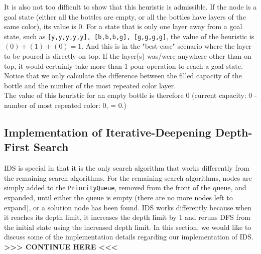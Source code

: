 \documentclass{article}
\begin{document}
It is also not too difficult to show that this heuristic is admissible. If the node is a goal state (either all the bottles are empty, or all the bottles have layers of the same color), its value is 0. For a state that is only one layer away from a goal state, such as \texttt{[y,y,y,y,y], [b,b,b,g], [g,g,g,g]}, the value of the heuristic is $(0) + (1) + (0) = 1$. And this is in the "best-case" scenario where the layer to be poured is directly on top. If the layer(s) was/were anywhere other than on top, it would certainly take more than 1 pour operation to reach a goal state. Notice that we only calculate the difference between the filled capacity of the bottle and the number of the most repeated color layer. \\

The value of this heuristic for an empty bottle is therefore 0 (current capacity: 0 - number of most repeated color: 0, = 0.)

\subsection{Implementation of Iterative-Deepening Depth-First Search}

IDS is special in that it is the only search algorithm that works differently from the remaining search algorithms. For the remaining search algorithms, nodes are simply added to the \texttt{PriorityQueue}, removed from the front of the queue, and expanded, until either the queue is empty (there are no more nodes left to expand), or a solution node has been found. IDS works differently because when it reaches its depth limit, it increases the depth limit by 1 and reruns DFS from the initial state using the increased depth limit. In this section, we would like to discuss some of the implementation details regarding our implementation of IDS. \\

\textbf{ >>> CONTINUE HERE <<<}
\end{document}
